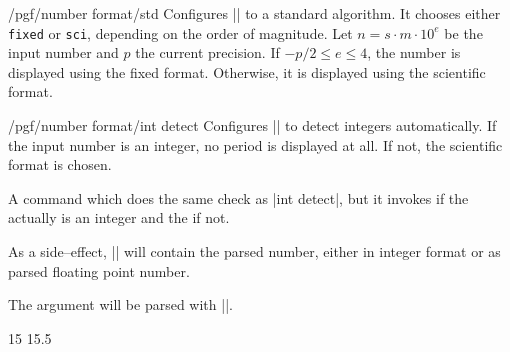 \begin{key}{/pgf/number format/std}
Configures |\pgfmathprintnumber| to a standard algorithm. It chooses either \texttt{fixed} or \texttt{sci}, depending on the order of magnitude. Let $n=s \cdot m \cdot 10^e$ be the input number and $p$ the current precision. If $-p/2 \le e \le 4$, the number is displayed using the fixed format. Otherwise, it is displayed using the scientific format. 

\begin{codeexample}[]
\hspace{1em}
\hspace{1em}
\hspace{1em}
\hspace{1em}
\end{codeexample}
\end{key}

\begin{key}{/pgf/number format/int detect}
Configures |\pgfmathprintnumber| to detect integers automatically. If the input number is an integer, no period is displayed at all. If not, the scientific format is chosen.

\begin{codeexample}[]
\hspace{1em}
\hspace{1em}
\hspace{1em}
\hspace{1em}
\end{codeexample}
\end{key}

\begin{command}{\pgfmathifisint{}}
	A command which does the same check as |int detect|, but it invokes  if the  actually is an integer and the  if not.

	As a side--effect, |\pgfretval| will contain the parsed number, either in integer format or as parsed floating point number.

	The argument  will be parsed with |\pgfmathfloatparsenumber|. 
\begin{codeexample}[]
15 \hspace{1em}
15.5 
\end{codeexample}
\end{command}

